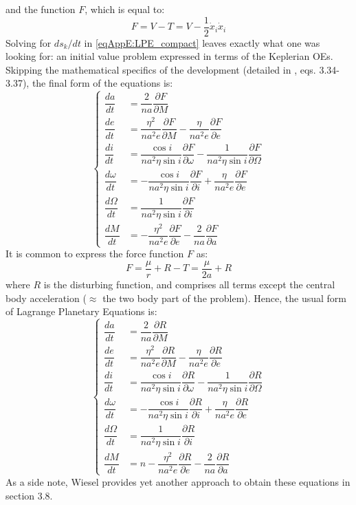 	\noindent and the function $F$, which is equal to:
	\[
	F = V - T = V - \frac{1}{2} \dot{x}_i \dot{x}_i
	\]
	\indent Solving for $ds_k/dt$ in \eqref{eqAppE:LPE_compact} leaves exactly what one was looking for: an initial value problem expressed in terms of the Keplerian OEs. Skipping the mathematical specifics of the development (detailed in \cite{Kaula}, eqs. 3.34-3.37), the final form of the equations is:
	\begin{equation}
	\left\{ \begin{array}{llll}
	\dfrac{da}{dt} 		& = \dfrac{2}{na} \dfrac{ \partial F}{\partial M} \\[1.2 em]
	\dfrac{de}{dt} 		& = \dfrac{\eta^2}{na^2 e} \dfrac{ \partial F}{\partial M} - \dfrac{\eta}{na^2e} \dfrac{\partial F}{\partial e} \\[1.2 em]
	\dfrac{di}{dt} 		& = \dfrac{\cos i}{na^2 \eta \sin i} \dfrac{ \partial F}{\partial \omega} - \dfrac{1}{na^2 \eta \sin i} \dfrac{\partial F}{\partial \Omega} \\[1.2 em]
	\dfrac{d\omega}{dt} & = -\dfrac{\cos i}{na^2 \eta \sin i} \dfrac{ \partial F}{\partial i} + \dfrac{\eta}{na^2  e} \dfrac{\partial F}{\partial e}\\[1.2 em]
	\dfrac{d\Omega}{dt} & = \dfrac{1}{na^2 \eta \sin i} \dfrac{ \partial F}{\partial i} \\[1.2 em]
	\dfrac{dM}{dt}		& = - \dfrac{\eta^2}{n a^2 e}\dfrac{\partial F}{\partial e} - \dfrac{2}{na} \dfrac{\partial F}{\partial a}
	\end{array}\right.
	\label{eq:LPE}
	\end{equation} 
	\indent It is common to express the force function $F$ as:
	\[
	F = \dfrac{\mu}{r} + R - T = \dfrac{\mu }{2a} + R
	\]
	\noindent where $R$ is the disturbing function, and comprises all terms except the central body acceleration ($\approx$ the two body part of the problem). Hence, the usual form of Lagrange Planetary Equations is:
	\begin{equation}
	\left\{ \begin{array}{llll}
	\dfrac{da}{dt} 		& = \dfrac{2}{na} \dfrac{ \partial R}{\partial M} \\[1.2 em]
	\dfrac{de}{dt} 		& = \dfrac{\eta^2}{na^2 e} \dfrac{ \partial R}{\partial M} - \dfrac{\eta}{na^2e} \dfrac{\partial R}{\partial e} \\[1.2 em]
	\dfrac{di}{dt} 		& = \dfrac{\cos i}{na^2 \eta \sin i} \dfrac{ \partial R}{\partial \omega} - \dfrac{1}{na^2 \eta \sin i} \dfrac{\partial R}{\partial \Omega} \\[1.2 em]
	\dfrac{d\omega}{dt} & = -\dfrac{\cos i}{na^2 \eta \sin i} \dfrac{ \partial R}{\partial i} + \dfrac{\eta}{na^2  e} \dfrac{\partial R}{\partial e}\\[1.2 em]
	\dfrac{d\Omega}{dt} & = \dfrac{1}{na^2 \eta \sin i} \dfrac{ \partial R}{\partial i} \\[1.2 em]
	\dfrac{dM}{dt}		& = n - \dfrac{\eta^2}{n a^2 e}\dfrac{\partial R}{\partial e} - \dfrac{2}{na} \dfrac{\partial R}{\partial a}
	\end{array}\right.
	\label{eq:LPE_final}
	\end{equation} 
	\indent As a side note, Wiesel \cite{Wiesel} provides yet another approach to obtain these equations in section 3.8.
